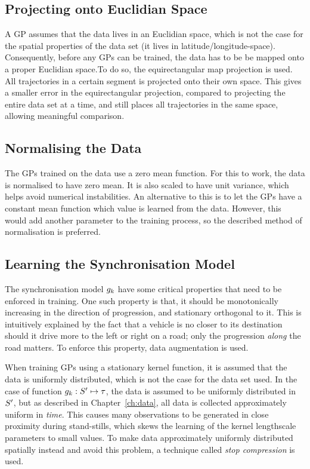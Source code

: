 \subsection{Projecting onto Euclidian Space}\label{projecting-onto-euclidian-space}
A GP assumes that the data lives in an Euclidian
space, which is not the case for the spatial properties of the data set 
(it lives in latitude/longitude-space). Consequently, before any GPs can be trained,
the data has to be be mapped onto a proper Euclidian space.To do so, 
the equirectangular map projection is used. 
All trajectories in a certain segment is projected onto their own
space. This gives a smaller error in the equirectangular projection,
compared to projecting the entire data set at a time, and still
places all trajectories in the same space, allowing 
meaningful comparison.

\subsection{Normalising the Data}\label{sec:normalising-the-data}
The GPs trained on the data use a zero mean function. For this to
work, the data is normalised to have zero mean. It is also scaled to
have unit variance, which helps avoid numerical instabilities.
An alternative to this is to let the GPs have a constant mean function
which value is learned from the data. However, this would add another
parameter to the training process, so the described method of normalisation
is preferred.

\subsection{Learning the Synchronisation Model}
The synchronisation model $g_{k}$ have some critical properties
that need to be enforced in training. One such property is that, 
it should be monotonically increasing in the direction of progression,
and stationary orthogonal to it. This is intuitively explained by the fact that a
vehicle is no closer to its destination should it drive more to the
left or right on a road; only the progression \textit{along} the road
matters. To enforce this property, data augmentation is used.

When training GPs using a stationary kernel function, it is assumed
that the data is uniformly distributed, which is not the case for the
data set used. In the case of function $g_{k} : S' \mapsto
\tau$, the data is assumed to be uniformly
distributed in $S'$, but as described in Chapter~\ref{ch:data},
all data is collected approximately uniform in \textit{time}. This causes many
observations to be generated in close proximity during stand-stills, which skews the
learning of the kernel lengthscale parameters to small values. To
make data approximately uniformly distributed spatially instead and 
avoid this problem, a technique called \textit{stop compression} is used.

